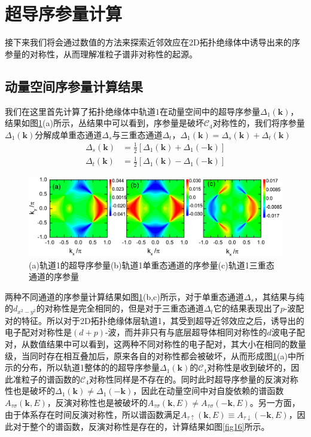 \section{超导序参量计算}
接下来我们将会通过数值的方法来探索近邻效应在2D拓扑绝缘体中诱导出来的序参量的对称性，从而理解准粒子谱非对称性的起源。
\subsection{动量空间序参量计算结果}
我们在这里首先计算了拓扑绝缘体中轨道$1$在动量空间中的超导序参量$\Delta_1(\mathbf{k})$，结果如图\ref{fig19}(a)所示，丛结果中可以看到，序参量是破坏$\mathcal{C}_4$对称性的，我们将序参量$\Delta_1(\mathbf{k})$分解成单重态通道$\Delta_s$与三重态通道$\Delta_t$，$\Delta_1(\mathbf{k})=\Delta_s(\mathbf{k})+\Delta_t(\mathbf{k})$
\begin{equation}
\begin{aligned}
\Delta_s(\mathbf{k})&=\frac{1}{2}\left[\Delta_1(\mathbf{k})+\Delta_1(\mathbf{-k})\right]\\
\Delta_t(\mathbf{k})&=\frac{1}{2}\left[\Delta_1(\mathbf{k})-\Delta_1(\mathbf{-k})\right]
\end{aligned}
\end{equation}
\begin{figure}[h]
\centering
\includegraphics[scale=0.8]{pic/fig20}
\caption{(a)轨道1的超导序参量(b)轨道1单重态通道的序参量(c)轨道1三重态通道的序参量}\label{fig19}
\end{figure}
两种不同通道的序参量计算结果如图\ref{fig19}(b,c)所示，对于单重态通道$\Delta_s$，其结果与纯的$d_{x^2-y^2}$的对称性是完全相同的，但是对于三重态通道$\Delta_t$它的结果表现出了$p$-波配对的特征。所以对于2D拓扑绝缘体层轨道1，其受到超导近邻效应之后，诱导出的电子配对对称性是$(d+p)$-波，而并非只有与底层超导体相同对称性的$d$波电子配对，从数值结果中可以看到，这两种不同对称性的电子配对，其大小在相同的数量级，当同时存在相互叠加后，原来各自的对称性都会被破坏，从而形成图\ref{fig19}(a)中所示的分布，所以轨道1整体的的超导序参量$\Delta_1(\mathbf{k})$的$\mathcal{C}_4$对称性是收到破坏的，因此准粒子的谱函数的$\mathcal{C}_4$对称性同样是不存在的。同时此时超导序参量的反演对称性也是破坏的$\Delta_1(\mathbf{k})\neq\Delta_1(\mathbf{-k})$，因此在动量空间中对自旋依赖的谱函数$A_{\tau\sigma}(\mathbf{k},E)$，反演对称性也是被破坏的$A_{\tau\sigma}(\mathbf{k},E)\neq A_{\tau\sigma}(-\mathbf{k},E)$。另一方面，由于体系存在时间反演对称性，所以谱函数满足$A_{\tau\uparrow}(\mathbf{k},E)\equiv A_{\tau\downarrow}(-\mathbf{k},E)$，因此对于整个的谱函数，反演对称性是存在的，计算结果如图\ref{fig16}所示。
